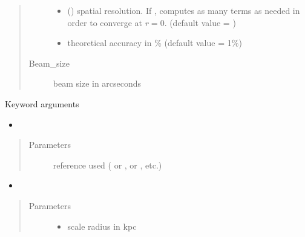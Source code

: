 \documentclass[letterpaper,10pt,english]{sphinxmanual}
\begin{document}
\begin{fulllineitems}
\begin{quote}
\begin{description}
\begin{itemize}
\item {} 
\sphinxAtStartPar
{} () \textendash{} spatial resolution. If ,  computes as many terms as needed in order to converge at \(r=0\). (default value = )

\item {} 
\sphinxAtStartPar
{} \textendash{} theoretical accuracy in \% (default value = 1\%)

\end{itemize}

\item[{Beam\_size}] \leavevmode
\sphinxAtStartPar
beam size in arcseconds

\end{description}\end{quote}

\sphinxAtStartPar
Keyword arguments
\begin{itemize}
\item {} 
\sphinxAtStartPar
{}

\end{itemize}
\begin{quote}\begin{description}
\item[{Parameters}] \leavevmode
\sphinxAtStartPar
{} \textendash{} reference used ( or \sphinxcode{\sphinxupquote{\textquotesingle{}1309.2641\textquotesingle{}}},  or \sphinxcode{\sphinxupquote{\textquotesingle{}1408.0002\textquotesingle{}}}, etc.)

\end{description}\end{quote}
\begin{itemize}
\item {} 
\sphinxAtStartPar
{}

\end{itemize}
\begin{quote}\begin{description}
\item[{Parameters}] \leavevmode\begin{itemize}
\item {} 
\sphinxAtStartPar
{} \textendash{} scale radius in kpc


\end{itemize}
\end{description}
\end{quote}
\end{fulllineitems}
\end{document}
